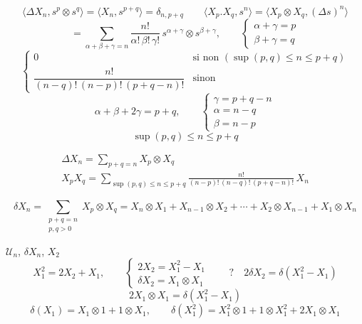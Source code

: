\documentclass[11pt,a4paper]{article}
\begin{document}
\[
\langle \Delta X_n, s^p \otimes s^q \rangle = \langle X_n, s^{p+q} \rangle
= \delta_{n,p+q}
\qquad
\langle X_p . X_q, s^n \rangle = \langle X_p \otimes X_q, (\Delta s)^n \rangle
\]
\[
= \sum_{\alpha+\beta+\gamma = n} \frac{n!}{\alpha!\,\beta!\,\gamma!}\,
s^{\alpha+\gamma} \otimes s^{\beta+\gamma},
\qquad
\left\lbrace
\begin{array}{l}
\alpha + \gamma = p \\
\beta + \gamma = q
\end{array}
\right.
\]
\[
\left\lbrace
\begin{array}{ll}
0 & \text{si non } (\sup(p,q) \leq n \leq p+q) \\[4pt]
\dfrac{n!}{(n-q)!\,(n-p)!\,(p+q-n)!} & \text{sinon}
\end{array}
\right.
\]
\[
\alpha + \beta + 2\gamma = p + q, \qquad
\left\lbrace
\begin{array}{l}
\gamma = p + q - n \\
\alpha = n - q \\
\beta = n - p
\end{array}
\right.
\]
\[
\sup(p,q) \leq n \leq p + q
\]

\[
\boxed{
\begin{array}{l}
\Delta X_n = \displaystyle\sum_{p+q=n} X_p \otimes X_q \\[10pt]
X_p X_q = \displaystyle\sum_{\sup(p,q) \leq n \leq p+q}
\frac{n!}{(n-p)!\,(n-q)!\,(p+q-n)!}\, X_n
\end{array}}
\]

\[
\delta X_n = \sum_{\substack{p+q=n \\ p,q>0}} X_p \otimes X_q
= X_n \otimes X_1 + X_{n-1} \otimes X_2 + \cdots + X_2 \otimes X_{n-1}
+ X_1 \otimes X_n
\]

$\mathcal{U}_n$, \quad $\delta X_n$, \quad $X_2$
\[
X_1^2 = 2X_2 + X_1, \qquad
\left\lbrace
\begin{array}{l}
2X_2 = X_1^2 - X_1 \\
\delta X_2 = X_1 \otimes X_1
\end{array}
\right.
\qquad ? \quad 2\delta X_2 = \delta(X_1^2 - X_1)
\]
\[
2X_1 \otimes X_1 = \delta(X_1^2 - X_1)
\]
\[
\delta(X_1) = X_1 \otimes 1 + 1 \otimes X_1, \qquad
\delta(X_1^2) = X_1^2 \otimes 1 + 1 \otimes X_1^2 + 2 X_1 \otimes X_1
\]
\end{document}
